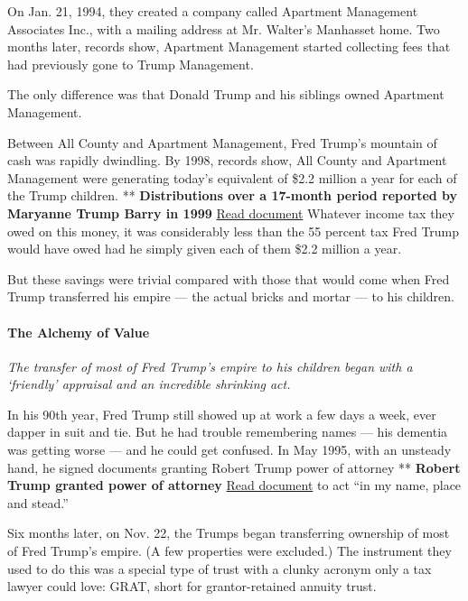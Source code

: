 On Jan. 21, 1994, they created a company called Apartment Management
Associates Inc., with a mailing address at Mr. Walter's Manhasset home.
Two months later, records show, Apartment Management started collecting
fees that had previously gone to Trump Management.

The only difference was that Donald Trump and his siblings owned
Apartment Management.

Between All County and Apartment Management, Fred Trump's mountain of
cash was rapidly dwindling. By 1998, records show, All County and
Apartment Management were generating today's equivalent of \$2.2 million
a year for each of the Trump children. ** \textbf{Distributions over a
17-month period reported by Maryanne Trump Barry in 1999}
\href{https://int.graylady3jvrrxbe.onion/data/documenthelper/139-marryanne-trump-barry/76fe49efb6b1ae8eabe3/optimized/full.pdf\#page=1}{Read
document} Whatever income tax they owed on this money, it was
considerably less than the 55 percent tax Fred Trump would have owed had
he simply given each of them \$2.2 million a year.

But these savings were trivial compared with those that would come when
Fred Trump transferred his empire --- the actual bricks and mortar ---
to his children.

\hypertarget{the-alchemy-of-value}{%
\paragraph{The Alchemy of Value}\label{the-alchemy-of-value}}

\emph{The transfer of most of Fred Trump's empire to his children began
with a `friendly' appraisal and an incredible shrinking act.}

In his 90th year, Fred Trump still showed up at work a few days a week,
ever dapper in suit and tie. But he had trouble remembering names ---
his dementia was getting worse --- and he could get confused. In May
1995, with an unsteady hand, he signed documents granting Robert Trump
power of attorney ** \textbf{Robert Trump granted power of attorney}
\href{https://int.graylady3jvrrxbe.onion/data/documenthelper/140-1995-power-of-attorney/76fe49efb6b1ae8eabe3/optimized/full.pdf\#page=1}{Read
document} to act ``in my name, place and stead.''

Six months later, on Nov. 22, the Trumps began transferring ownership of
most of Fred Trump's empire. (A few properties were excluded.) The
instrument they used to do this was a special type of trust with a
clunky acronym only a tax lawyer could love: GRAT, short for
grantor-retained annuity trust.

